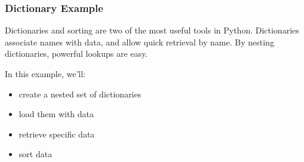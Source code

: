 \documentclass[10pt]{beamer}
\begin{document}
\begin{frame}[fragile]
\frametitle{Dictionary Example}

Dictionaries and sorting are two of the most useful tools in Python.  
Dictionaries associate names with data, and allow quick retrieval by name.
By nesting dictionaries, powerful lookups are easy.

In this example, we'll:

\begin{itemize}
\item create a nested set of dictionaries
\item load them with data
\item retrieve specific data
\item sort data
\end{itemize}

\end{frame}
\end{document}
